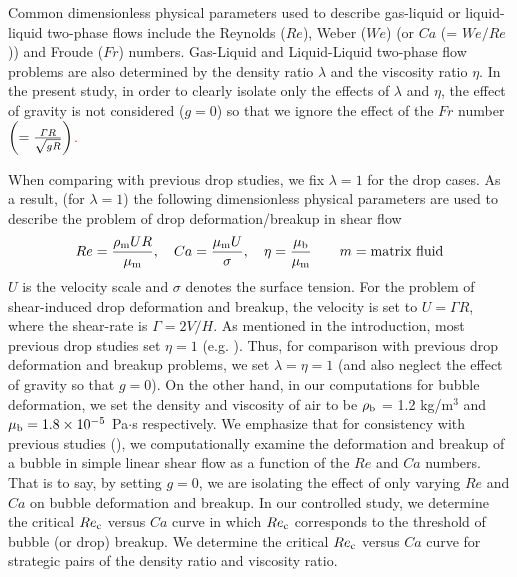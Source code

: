 \documentclass{elsarticle}
\begin{document}
Common dimensionless physical parameters used to describe gas-liquid or
liquid-liquid two-phase flows include the Reynolds ($Re$), Weber ($We$) (or
$Ca$ (= $We/Re$)) and Froude ($Fr$) numbers.  Gas-Liquid and Liquid-Liquid
two-phase flow problems are also determined by the density ratio $\lambda$ and
the viscosity ratio $\eta$.  In the present study, in order to clearly isolate only the effects 
of $\lambda$ and $\eta$, the effect of gravity is not considered ($g = 0$) so that 
we ignore the effect of the $Fr$ number 
\textcolor{red}
{
$\left(= \frac{{\it \Gamma}R}{\sqrt {gR}} \right)$.
}

When comparing with previous drop studies, we fix $\lambda=1$ for the drop cases.  As a result,
(for $\lambda=1$) the following dimensionless physical parameters are used to
describe the problem of drop deformation/breakup in shear flow
%
\begin{eqnarray}\label{dimensonless}
  Re = \frac{\rho_{\rm m}UR}{\mu_{\rm m}}, \quad
  Ca = \frac{\mu_{\rm m}U}{\sigma}, \quad
  \eta = \frac{\mu_{\rm b}}{\mu_{\rm m}} 
	\hspace{20pt} m=\mbox{matrix fluid}
\end{eqnarray}
%
$U$ is the velocity scale and $\sigma$ denotes the surface tension.  For the
problem of shear-induced drop deformation and breakup, the velocity is set to
$U = \mathit{\Gamma} R$, where the shear-rate is $\mathit{\Gamma} = 2V/H$.  As
mentioned in the introduction, most previous drop studies set $\eta = 1$ (e.g.
\citet{LiRenRen00}).  Thus, for comparison with previous drop deformation and
breakup problems, we set $\lambda = \eta = 1$ (and also neglect the effect of
gravity so that $g=0$). On the other hand, in our computations for bubble
deformation, we set the density and viscosity of air to be $\rho_{\rm b}$ = 1.2
kg/m$^{3}$ and $\mu_{\rm b} = 1.8 \times 10^{-5}$ Pa$\cdot$s respectively.  We
emphasize that for consistency with previous studies (\citet{LiRenRen00,
RusMan02, MulTobDreFisWin08, KomShaEskDer14, AmaBalCasOli19}), we
computationally examine the deformation and breakup of a bubble in simple
linear shear flow as a function of the $Re$ and $Ca$ numbers.  That is to say,
by setting $g=0$, we are isolating the effect of only varying $Re$ and $Ca$ on
bubble deformation and breakup.  In our controlled study, we determine the
critical $Re_{\rm c}$ versus $Ca$ curve in which $Re_{\rm c}$ corresponds to
the threshold of bubble (or drop) breakup.  We determine the critical $Re_{\rm
c}$ versus $Ca$ curve for strategic pairs of the density ratio and viscosity
ratio.
\end{document}
